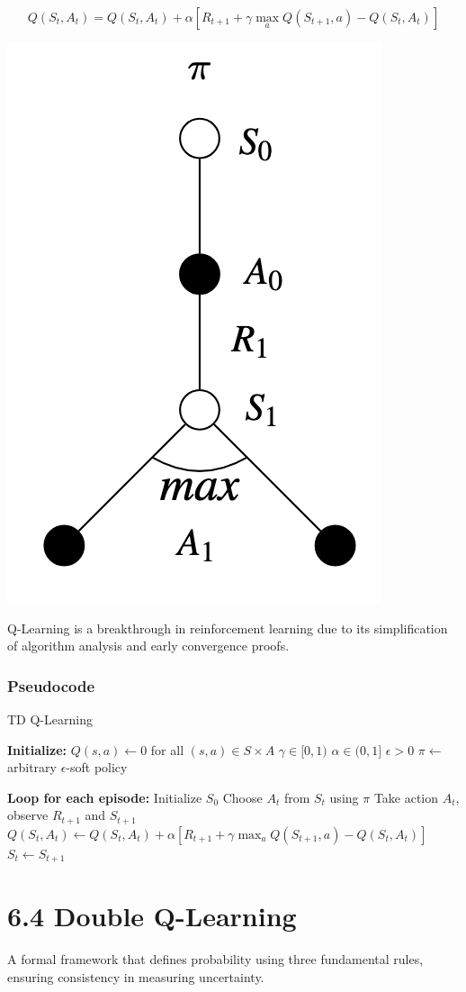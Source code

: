 \documentclass[
  letterpaper,
  DIV=11,
  numbers=noendperiod]{scrreprt}
\begin{document}
\[
Q(S_{t},A_{t}) = Q(S_{t},A_{t}) + \alpha [ R_{t+1} + \gamma \max_{a} Q(S_{t+1},a) - Q(S_{t},A_{t})]
\]

\begin{center}
\includegraphics[width=0.22\linewidth,height=\textheight,keepaspectratio]{lecture6/images/Q-Learning.png}
\end{center}

Q-Learning is a breakthrough in reinforcement learning due to its
simplification of algorithm analysis and early convergence proofs.

\subsection{Pseudocode}\label{pseudocode-11}

\begin{algorithm}[htb!]
\caption{TD Q-Learning}
\begin{algorithmic}[1]
\State \textbf{Initialize:} 
\State $Q(s, a) \gets 0$ for all $(s, a) \in S \times A$
\State $\gamma \in [0, 1)$
\State $\alpha \in (0, 1]$
\State $\epsilon > 0$
\State $\pi \gets$ arbitrary $\epsilon$-soft policy

\State \textbf{Loop for each episode:}
\State Initialize $S_{0}$
\Repeat
    \State Choose $A_{t}$ from $S_{t}$ using $\pi$
    \State Take action $A_{t}$, observe $R_{t+1}$ and $S_{t+1}$
    \State $Q(S_{t}, A_{t}) \gets Q(S_{t}, A_{t}) + \alpha \left[R_{t+1} + \gamma \max_{a} Q(S_{t+1}, a) - Q(S_{t}, A_{t})\right]$
    \State $S_{t} \gets S_{t+1}$

\end{algorithmic}
\end{algorithm}

\chapter{6.4 Double Q-Learning}\label{double-q-learning}

\begin{tcolorbox}[enhanced jigsaw, arc=.35mm, toprule=.15mm, leftrule=.75mm, colback=white, left=2mm, colframe=quarto-callout-note-color-frame, rightrule=.15mm, opacityback=0, breakable, bottomrule=.15mm]

A formal framework that defines probability using three fundamental
rules, ensuring consistency in measuring uncertainty. 🎲

\end{tcolorbox}
\end{document}
